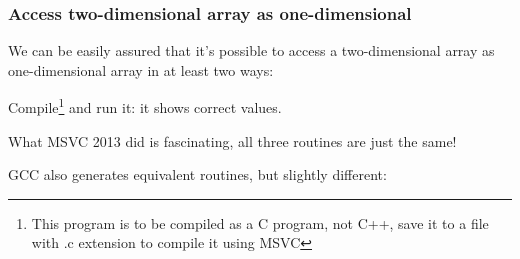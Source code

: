﻿\subsubsection{Access two-dimensional array as one-dimensional}

We can be easily assured that it's possible to access a two-dimensional array as one-dimensional array in at least two ways:



Compile\footnote{This program is to be compiled as a C program, not C++, save it to a file with .c extension to compile it using MSVC}
and run it: it shows correct values.

What MSVC 2013 did is fascinating, all three routines are just the same!



GCC also generates equivalent routines, but slightly different:



